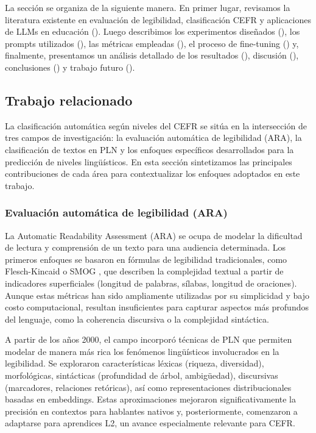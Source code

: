 La sección se organiza de la siguiente manera. En primer lugar, revisamos la literatura existente en evaluación de legibilidad, clasificación CEFR y aplicaciones de LLMs en educación (). Luego describimos los experimentos diseñados (), los prompts utilizados (), las métricas empleadas (), el proceso de fine-tuning () y, finalmente, presentamos un análisis detallado de los resultados (), discusión (), conclusiones () y trabajo futuro ().

\subsection{Trabajo relacionado}\label{subsection:clas_trabajo}
La clasificación automática según niveles del CEFR se sitúa en la intersección de tres campos de investigación: la evaluación automática de legibilidad (ARA), la clasificación de textos en PLN y los enfoques específicos desarrollados para la predicción de niveles lingüísticos. En esta sección sintetizamos las principales contribuciones de cada área para contextualizar los enfoques adoptados en este trabajo.

\subsubsection*{Evaluación automática de legibilidad (ARA)}
La Automatic Readability Assessment (ARA) se ocupa de modelar la dificultad de lectura y comprensión de un texto para una audiencia determinada. Los primeros enfoques se basaron en fórmulas de legibilidad tradicionales, como Flesch-Kincaid \parencite{Kincaid1975} o SMOG \parencite{smog}, que describen la complejidad textual a partir de indicadores superficiales (longitud de palabras, sílabas, longitud de oraciones). Aunque estas métricas han sido ampliamente utilizadas por su simplicidad y bajo costo computacional, resultan insuficientes para capturar aspectos más profundos del lenguaje, como la coherencia discursiva o la complejidad sintáctica.

A partir de los años 2000, el campo incorporó técnicas de PLN que permiten modelar de manera más rica los fenómenos lingüísticos involucrados en la legibilidad. Se exploraron características léxicas (riqueza, diversidad), morfológicas, sintácticas (profundidad de árbol, ambigüedad), discursivas (marcadores, relaciones retóricas), así como representaciones distribucionales basadas en embeddings. Estas aproximaciones mejoraron significativamente la precisión en contextos para hablantes nativos y, posteriormente, comenzaron a adaptarse para aprendices L2, un avance especialmente relevante para CEFR.


